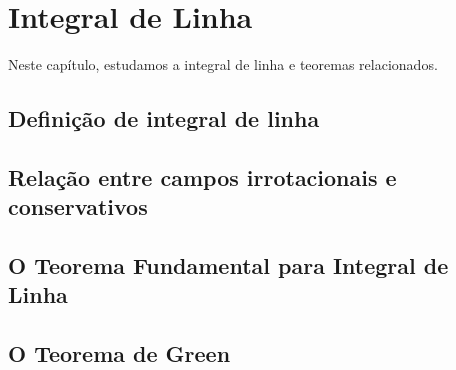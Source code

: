 \chapter{Integral de Linha}
  Neste capítulo, estudamos a integral de linha e teoremas relacionados.
\section{Definição de integral de linha}
\section{Relação entre campos irrotacionais e conservativos}
\section{O Teorema Fundamental para Integral de Linha}
\section{O Teorema de Green}


